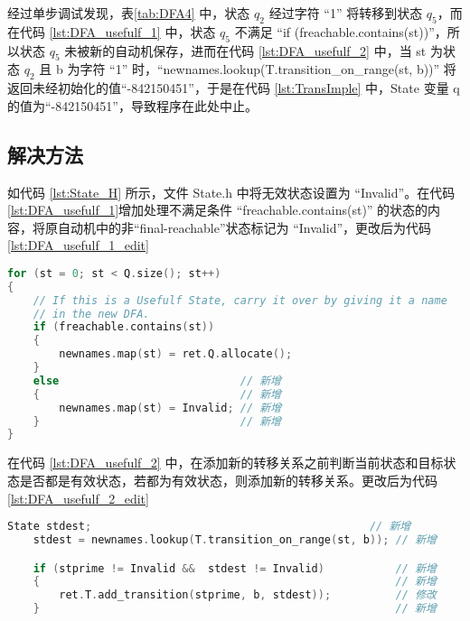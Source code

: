 经过单步调试发现，表\ref{tab:DFA4} 中，状态 $q_2$ 经过字符 “1” 将转移到状态 $q_5$，而在代码 \ref{lst:DFA_usefulf_1} 中，状态 $q_5$ 不满足 “if (freachable.contains(st))”，所以状态 $q_5$ 未被新的自动机保存，进而在代码 \ref{lst:DFA_usefulf_2} 中，当 st 为状态 $q_2$ 且 b 为字符 “1” 时，“newnames.lookup(T.transition\_on\_range(st, b))” 将返回未经初始化的值“-842150451”，于是在代码 \ref{lst:TransImple} 中，State 变量 q 的值为“-842150451”，导致程序在此处中止。

\subsection{解决方法}

如代码 \ref{lst:State_H} 所示，文件 State.h 中将无效状态设置为 “Invalid”。在代码 \ref{lst:DFA_usefulf_1}增加处理不满足条件 “freachable.contains(st)” 的状态的内容，将原自动机中的非“final-reachable”状态标记为 “Invalid”，更改后为代码 \ref{lst:DFA_usefulf_1_edit}
\lstset{style=mystyle}
\begin{lstlisting}[language=C++,label={lst:DFA_usefulf_1_edit},caption={ 更改后的 DFA.cpp },firstnumber=91]
for (st = 0; st < Q.size(); st++)
{
    // If this is a Usefulf State, carry it over by giving it a name
    // in the new DFA.
    if (freachable.contains(st))
    {
        newnames.map(st) = ret.Q.allocate();
    }
    else                            // 新增
    {                               // 新增
        newnames.map(st) = Invalid; // 新增
    }                               // 新增
}
\end{lstlisting}

在代码 \ref{lst:DFA_usefulf_2} 中，在添加新的转移关系之前判断当前状态和目标状态是否都是有效状态，若都为有效状态，则添加新的转移关系。更改后为代码 \ref{lst:DFA_usefulf_2_edit}
\lstset{style=mystyle}
\begin{lstlisting}[language=C++,label={lst:DFA_usefulf_2_edit},caption={ 更改后的 DFA.cpp },firstnumber=133]
    State stdest;                                           // 新增
    stdest = newnames.lookup(T.transition_on_range(st, b)); // 新增

    if (stprime != Invalid &&  stdest != Invalid)           // 新增
    {                                                       // 新增
        ret.T.add_transition(stprime, b, stdest));          // 修改
    }                                                       // 新增
\end{lstlisting}

